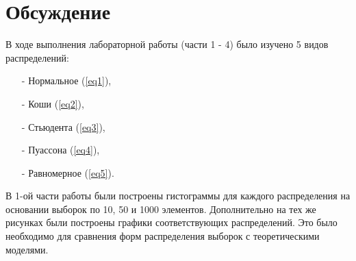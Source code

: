 \newpage
\section{Обсуждение}
В ходе выполнения лабораторной работы (части 1 - 4) было изучено 5 видов распределений:
\begin{itemize}
    \item[-] Нормальное (\ref{eq1}),
    \item[-] Коши (\ref{eq2}),
    \item[-] Стьюдента (\ref{eq3}),
    \item[-] Пуассона (\ref{eq4}),
    \item[-] Равномерное (\ref{eq5}).
\end{itemize}

В 1-ой части работы были построены гистограммы для каждого распределения на основании выборок по 10, 50 и 1000 элементов. Дополнительно на тех же рисунках были построены графики соответствующих распределений. Это было необходимо для сравнения форм распределения выборок с теоретическими моделями.\\

